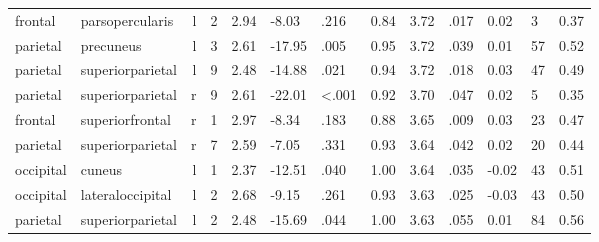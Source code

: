\documentclass{article}
\begin{document}
\begin{longtable}{llrR{1.3cm}R{1cm}R{1.3cm}R{1cm}R{1cm}R{1.3cm}R{1cm}R{1.8cm}R{1.3cm}R{1.8cm}}
   frontal &           parsopercularis &    l &         2 &                  2.94 &            -8.03 &               .216 &                               0.84 &                          3.72 &                            .017 &   0.02 &      3 &      0.37 \\
  parietal &                 precuneus &    l &         3 &                  2.61 &           -17.95 &               .005 &                               0.95 &                          3.72 &                            .039 &   0.01 &     57 &      0.52 \\
  parietal &          superiorparietal &    l &         9 &                  2.48 &           -14.88 &               .021 &                               0.94 &                          3.72 &                            .018 &   0.03 &     47 &      0.49 \\
  parietal &          superiorparietal &    r &         9 &                  2.61 &           -22.01 &      \textless.001 &                               0.92 &                          3.70 &                            .047 &   0.02 &      5 &      0.35 \\
   frontal &           superiorfrontal &    r &         1 &                  2.97 &            -8.34 &               .183 &                               0.88 &                          3.65 &                            .009 &   0.03 &     23 &      0.47 \\
  parietal &          superiorparietal &    r &         7 &                  2.59 &            -7.05 &               .331 &                               0.93 &                          3.64 &                            .042 &   0.02 &     20 &      0.44 \\
 occipital &                    cuneus &    l &         1 &                  2.37 &           -12.51 &               .040 &                               1.00 &                          3.64 &                            .035 &  -0.02 &     43 &      0.51 \\
 occipital &          lateraloccipital &    l &         2 &                  2.68 &            -9.15 &               .261 &                               0.93 &                          3.63 &                            .025 &  -0.03 &     43 &      0.50 \\
  parietal &          superiorparietal &    l &         2 &                  2.48 &           -15.69 &               .044 &                               1.00 &                          3.63 &                            .055 &   0.01 &     84 &      0.56 \\

\end{longtable}
\end{document}
